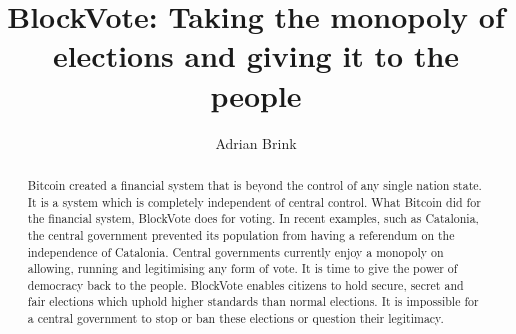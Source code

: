 \documentclass{article}
\title{BlockVote: Taking the monopoly of elections and giving it to the people}
\author{Adrian Brink}
\begin{document}
\maketitle

\begin{abstract}
Bitcoin created a financial system that is beyond the control of any single nation state. It is a system which is completely independent of central control. What Bitcoin did for the financial system, BlockVote does for voting. In recent examples, such as Catalonia, the central government prevented its population from having a referendum on the independence of Catalonia. Central governments currently enjoy a monopoly on allowing, running and legitimising any form of vote. It is time to give the power of democracy back to the people. BlockVote enables citizens to hold secure, secret and fair elections which uphold higher standards than normal elections. It is impossible for a central government to stop or ban these elections or question their legitimacy. 
\end{abstract}


\end{document}
